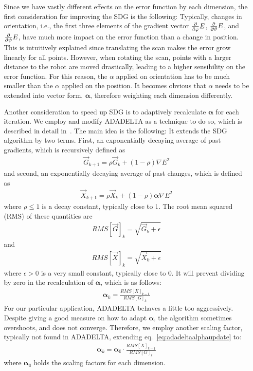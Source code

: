 Since we have vastly different effects on the error function by each dimension, the first consideration for improving the SDG is the following:
Typically, changes in orientation, i.e., the first three elements of the gradient vector $\frac{\partial}{\partial \varphi}E$, $\frac{\partial}{\partial \vartheta}E$, and $\frac{\partial}{\partial \psi}E$, have much more impact on the error function than a change in position.
This is intuitively explained since translating the scan makes the error grow linearly for all points.
However, when rotating the scan, points with a larger distance to the robot are moved drastically, leading to a higher sensibility on the error function.
For this reason, the $\alpha$ applied on orientation has to be much smaller than the $\alpha$ applied on the position.
It becomes obvious that $\alpha$ needs to be extended into vector form, $\boldsymbol\alpha$, therefore weighting each dimension differently.

Another consideration to speed up SDG is to adaptively recalculate $\boldsymbol\alpha$ for each iteration. 
We employ and modify ADADELTA as a technique to do so, which is described in detail in~\cite{zeiler2012adadelta}.
The main idea is the following:
It extends the SDG algorithm by two terms.
First, an exponentially decaying average of past gradients, which is recursively defined as
\begin{align}
    \vec{G}_{k+1} = \rho \vec{G}_{k} + (1 - \rho) {\nabla E}^2
\end{align}
and second, an exponentially decaying average of past changes, which is defined as
\begin{align}
    \vec{X}_{k+1} = \rho \vec{X}_{k} + (1 - \rho) {\boldsymbol\alpha \nabla E}^2
\end{align}
where $\rho \leq 1$ is a decay constant, typically close to $1$.
The root mean squared (RMS) of these quantities are
\begin{align}
    RMS[\vec{G}]_{k} = \sqrt{\vec{G}_{k} + \epsilon}
\end{align}
and 
\begin{align}
    RMS[\vec{X}]_{k} = \sqrt{\vec{X}_{k} + \epsilon}
\end{align}
where $\epsilon > 0$ is a very small constant, typically close to $0$.
It will prevent dividing by zero in the recalculation of $\boldsymbol\alpha$, which is as follows:
\begin{align}
    \boldsymbol\alpha_{k} = \frac{RMS[X]_{k-1}}{RMS[G]_{k}}
    \label{eq:adadeltaalphaupdate}
\end{align} 
For our particular application, ADADELTA behaves a little too aggressively.
Despite giving a good measure on how to adapt $\boldsymbol\alpha$, the algorithm sometimes overshoots, and does not converge.
Therefore, we employ another scaling factor, typically not found in ADADELTA, extending eq.~\eqref{eq:adadeltaalphaupdate} to:
\begin{align}
    \boldsymbol\alpha_{k} = \boldsymbol\alpha_0 \cdot \frac{RMS[X]_{k-1}}{RMS[G]_{k}}
    \label{eq:adafinalized}
\end{align} 
where $\boldsymbol\alpha_0 $ holds the scaling factors for each dimension.

